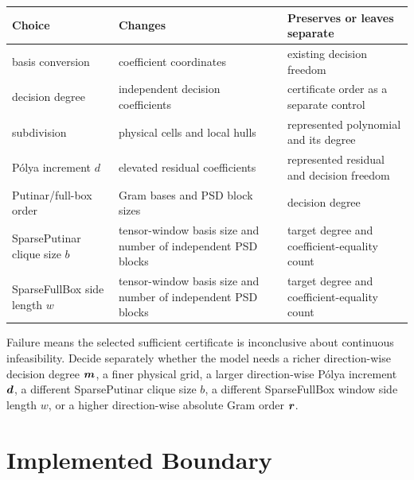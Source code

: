\begin{tabularx}{\textwidth}{@{}p{}Y Y@{}}
\toprule
Choice & Changes & Preserves or leaves separate \\
\midrule
basis conversion & coefficient coordinates & existing decision freedom \\
decision degree & independent decision coefficients & certificate order as a separate control \\
subdivision & physical cells and local hulls & represented polynomial and its degree \\
P\'olya increment $d$ & elevated residual coefficients & represented residual and decision freedom \\
Putinar/full-box order & Gram bases and PSD block sizes & decision degree \\
SparsePutinar clique size $b$ & tensor-window basis size and number of independent PSD blocks & target degree and coefficient-equality count \\
SparseFullBox side length $w$ & tensor-window basis size and number of independent PSD blocks & target degree and coefficient-equality count \\
\bottomrule
\end{tabularx}

Failure means the selected sufficient certificate is inconclusive about continuous infeasibility. Decide separately whether the model needs a richer direction-wise decision degree $\boldsymbol{m}$, a finer physical grid, a larger direction-wise P\'olya increment $\boldsymbol{d}$, a different SparsePutinar clique size $b$, a different SparseFullBox window side length $w$, or a higher direction-wise absolute Gram order $\boldsymbol{r}$.

\section{Implemented Boundary}
\label{sec:certificate-boundary}

